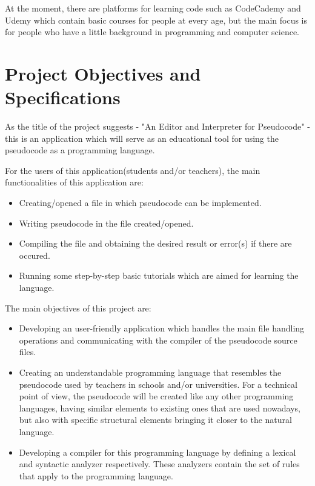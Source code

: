 \documentclass[12pt,a4paper,twoside]{report}
\begin{document}
	At the moment, there are platforms for learning code such as CodeCademy and Udemy which contain basic courses for people at every age, but the main focus is for people who have a little background in programming and computer science.
	
	

\chapter{Project Objectives and Specifications}


As the title of the project suggests - "An Editor and Interpreter for Pseudocode" - this is an application which will serve as an educational tool for using the pseudocode as a programming language.

For the users of this application(students and/or teachers), the main functionalities of this application are:
\begin{itemize}
	\item Creating/opened a file in which pseudocode can be implemented.
	\item Writing pseudocode in the file created/opened.
	\item Compiling the file and obtaining the desired result or error(s) if there are occured.
	\item Running some step-by-step basic tutorials which are aimed for learning the language.
\end{itemize}


The main objectives of this project are:
\begin{itemize}
	\item Developing an user-friendly application which handles the main file handling operations and communicating with the compiler of the pseudocode source files.
	\item Creating an understandable programming language that resembles the pseudocode used by teachers in schools and/or universities. For a technical point of view, the pseudocode will be created like any other programming languages, having similar elements to existing ones that are used nowadays, but also with specific structural elements bringing it closer to the natural language.
	\item Developing a compiler for this programming language by defining a lexical and syntactic analyzer respectively. These analyzers contain the set of rules that apply to the programming language. 
\end{itemize}
\end{document}
